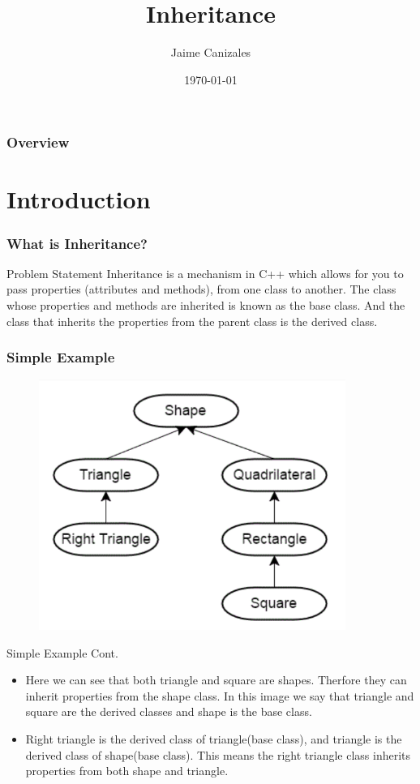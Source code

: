 \documentclass{beamer}
\title[Inheritance]{Inheritance}
\author{Jaime Canizales}
\institute[Hunter College] 
{
City University of New York \\ 
\medskip
\textit{jaime.canizales@hunter.cuny.edu} 
}
\date{\today}
\begin{document}
\begin{frame}
\titlepage 
\end{frame}


\begin{frame} \frametitle{Overview} 
\tableofcontents
\end{frame}


\section{Introduction}
\begin{frame}\frametitle{What is Inheritance?}
\begin{block}{Problem Statement}
    Inheritance is a mechanism in C++ which allows for you to pass 
    properties (attributes and methods), from one class to another. 
    The class whose properties and methods are inherited is known as the base class.
     And the class that inherits the properties from the parent class is the derived class.
\end{block}
\end{frame}


\begin{frame}\frametitle{Simple Example}
    \begin{figure}
        \includegraphics[width=10cm]{shapes.png}
    \end{figure}
    \end{frame}


\begin{frame}{Simple Example Cont.}
\begin{itemize}
\item Here we can see that both triangle and square are shapes. Therfore they can inherit properties
from the shape class. In this image we say that triangle and square are the derived classes and shape is the base class.
\item Right triangle is the derived class of triangle(base class), and triangle is the derived class
of shape(base class). This means the right triangle class inherits properties from both shape and triangle.
\end{itemize}
\end{frame}
\end{document}
